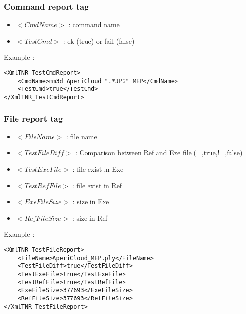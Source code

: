 \documentclass[a4paper]{book}
\begin{document}
\subsubsection{Command report tag}
\begin{itemize}
\item $<CmdName>$ : command name
\item $<TestCmd>$ :  ok (true) or fail (false)\\
\end{itemize}

Example : 
\begin{lstlisting}
<XmlTNR_TestCmdReport>
	<CmdName>mm3d AperiCloud ".*JPG" MEP</CmdName>
	<TestCmd>true</TestCmd>
</XmlTNR_TestCmdReport>
\end{lstlisting}

\subsubsection{File report tag}
\begin{itemize}
\item $<FileName>$ : file name
\item $<TestFileDiff>$ : Comparison between Ref and Exe file (=,true,!=,false)
\item $<TestExeFile>$ : file exist in Exe
\item $<TestRefFile>$ : file exist in Ref
\item $<ExeFileSize>$ : size in Exe
\item $<RefFileSize>$ : size in Ref\\
\end{itemize}

Example : 
\begin{lstlisting}
<XmlTNR_TestFileReport>
	<FileName>AperiCloud_MEP.ply</FileName>
	<TestFileDiff>true</TestFileDiff>
	<TestExeFile>true</TestExeFile>
	<TestRefFile>true</TestRefFile>
	<ExeFileSize>377693</ExeFileSize>
	<RefFileSize>377693</RefFileSize>
</XmlTNR_TestFileReport>
\end{lstlisting}
\end{document}
